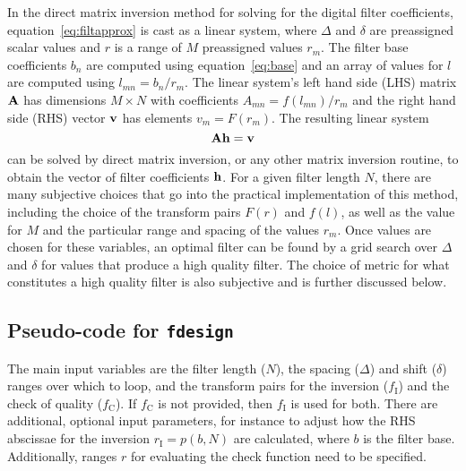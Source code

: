 \documentclass[paper,twocolumn,twoside]{geophysics}
\newcommand{\mr}[1]{\mathrm{#1}}
\begin{document}
In the direct matrix inversion method for solving for the digital filter
coefficients, equation~\ref{eq:filtapprox} is cast as a linear system,
where $\Delta$ and $\delta$ are preassigned scalar values and
$r$ is a range of $M$ preassigned values $r_m$. The filter base coefficients
$b_n$ are computed using equation~\ref{eq:base} and an array of values for $l$
are computed using $l_{mn} = b_n/r_m$. The linear system's left hand side (LHS)
matrix $\bf{A}$ has dimensions $M \times N$ with coefficients
$A_{mn} = f(l_{mn})/r_m$ and the right hand side (RHS)
vector $\bf{v}$ has elements $v_m = F(r_m)$. The
resulting linear system
%
\begin{equation}
  \bf{A}\bf{h} = \bf{v}
  \label{eq:,linearSystem}
\end{equation}
%
can be solved by direct matrix inversion, or any other matrix inversion
routine, to obtain the vector of filter coefficients $\bf{h}$. For a given
filter length $N$, there are many subjective choices that go into the practical
implementation of this method, including the choice of the transform pairs
$F(r)$ and $f(l)$, as well as the value for $M$ and the particular range and
spacing of the values $r_m$. Once values are chosen for these variables, an
optimal filter can be found by a grid search over $\Delta$ and $\delta$ for
values that produce a high quality filter. The choice of metric for what
constitutes a high quality filter is also subjective and is further discussed
below.

\subsection{Pseudo-code for \texttt{fdesign} }

The main input variables are the filter length ($N$), the spacing ($\Delta$)
and shift ($\delta$) ranges over which to loop, and the transform pairs for the
inversion ($f_\mr{I}$) and the check of quality ($f_\mr{C}$). If $f_\mr{C}$ is
not provided, then $f_\mr{I}$ is used for both. There are additional, optional
input parameters, for instance to adjust how the RHS abscissae for the
inversion $r_\mr{I} = p(b, N)$ are calculated, where $b$ is the filter base.
Additionally, ranges $r$ for evaluating the check function need to be
specified.
\end{document}
